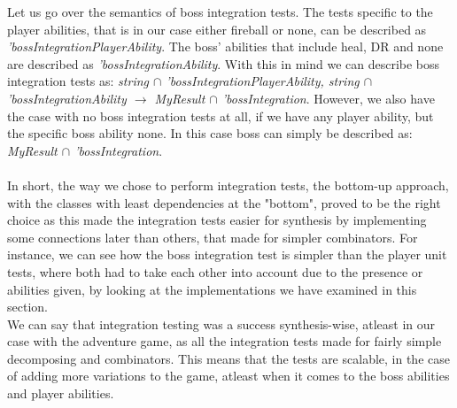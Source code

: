 Let us go over the semantics of boss integration tests. The tests specific to the player abilities, that is in our case either fireball or none, can be described as \textit{'bossIntegrationPlayerAbility}. The boss' abilities that include heal, DR and none are described as \textit{'bossIntegrationAbility}. With this in mind we can describe boss integration tests as: \textit{string $\cap$ 'bossIntegrationPlayerAbility, string $\cap$ 'bossIntegrationAbility $\to$ MyResult $\cap$ 'bossIntegration}. However, we also have the case with no boss integration tests at all, if we have any player ability, but the specific boss ability none. In this case boss can simply be described as: \textit{MyResult $\cap$ 'bossIntegration}. \\
\\
In short, the way we chose to perform integration tests, the bottom-up approach, with the classes with least dependencies at the "bottom", proved to be the right choice as this made the integration tests easier for synthesis by implementing some connections later than others, that made for simpler combinators. For instance, we can see how the boss integration test is simpler than the player unit tests, where both had to take each other into account due to the presence or abilities given, by looking at the implementations we have examined in this section. \\
We can say that integration testing was a success synthesis-wise, atleast in our case with the adventure game, as all the integration tests made for fairly simple decomposing and combinators. This means that the tests are scalable, in the case of adding more variations to the game, atleast when it comes to the boss abilities and player abilities.